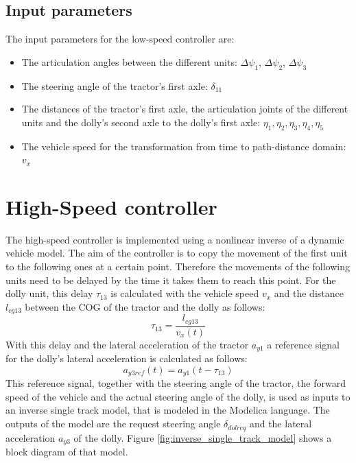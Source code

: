 \documentclass[ExampleMasters.tex]{subfiles}
\begin{document}
\subsection{Input parameters}
\label{sec:input_parameters_LS}
The input parameters for the low-speed controller are:
\begin{itemize}
	\item The articulation angles between the different units: $\Delta\psi_1$, $\Delta\psi_2$, $\Delta\psi_3$
	\item The steering angle of the tractor's first axle: $\delta_{11}$
	\item The distances of the tractor's first axle, the articulation joints of the different units and the dolly's second axle to the dolly's first axle: $\eta_1,\eta_2,\eta_3,\eta_4,\eta_5$
	\item The vehicle speed for the transformation from time to path-distance domain:  $v_x$
	
\end{itemize}

\section{High-Speed controller \cite{High-speed_paper}}
\label{sec:high-speed_controller}
The high-speed controller is implemented using a nonlinear inverse of a dynamic vehicle model.
The aim of the controller is to copy the movement of the first unit to the following ones at a certain point. Therefore the movements of the following units need to be delayed by the time it takes them to reach this point. For the dolly unit, this delay $\tau_{13}$ is calculated with the vehicle speed $v_x$ and the distance $l_{cg13}$ between the \gls{COG}  of the tractor and the dolly as follows:
\begin{equation}
\tau_{13}=\frac{l_{cg13}}{v_x(t)}
\end{equation}
With this delay and the lateral acceleration of the tractor $a_{y1}$ a reference signal for the dolly's lateral acceleration is calculated as follows:
\begin{equation}
a_{y3ref}(t)=a_{y1}(t-\tau_{13})
\end{equation}
This reference signal, together with the steering angle of the tractor, the forward speed of the vehicle and the actual steering angle of the dolly, is used as inputs to an inverse single track model, that is modeled in the Modelica language. The outputs of the model are the request steering angle $\delta_{dolreq}$ and the lateral acceleration $a_{y3}$ of the dolly. Figure \ref{fig:inverse_single_track_model} shows a block diagram of that model.  
\end{document}
